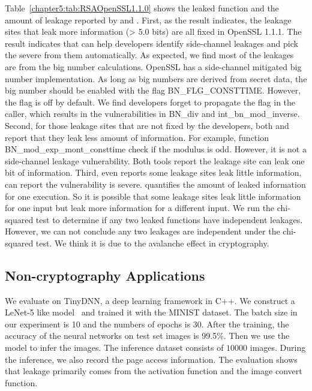 Table~\ref{chapter5:tab:RSAOpenSSL1.1.0} shows the leaked function and the amount of leakage reported by \tool{} and \ctool{}. First, as the result indicates, the leakage sites that leak more information (> 5.0 bits) are all fixed in OpenSSL 1.1.1. The result indicates that \ctool{} can help developers identify side-channel leakages and pick the severe from them automatically. As expected, we find most of the leakages are from the big number calculations. OpenSSL has a side-channel mitigated big number implementation. As long as big numbers are derived from secret data, the big number should be enabled with the flag \textsf{BN\_FLG\_CONSTTIME}. However, the flag is off by default. We find developers forget to propagate the flag in the caller, which results in the vulnerabilities in \textsf{BN\_div} and \textsf{int\_bn\_mod\_inverse}. Second, for those leakage sites that are not fixed by the developers, both \tool{} and \ctool{} report that they leak less amount of information. For example, function \textsf{BN\_mod\_exp\_mont\_consttime} check if the modulus is odd. However, it is not a side-channel leakage vulnerability. Both tools report the leakage site can leak one bit of information. Third, even \tool{} reports some leakage sites leak little information, \ctool{} can report the vulnerability is severe. \tool{} quantifies the amount of leaked information for one execution. So it is possible that some leakage sites leak little information for one input but leak more information for a different input. We run the chi-squared test to determine if any two leaked functions have independent leakages. However, we can not conclude any two leakages are independent under the chi-squared test. We think it is due to the avalanche effect in cryptography.

\subsection{Non-cryptography Applications}



We evaluate \ctool{} on TinyDNN, a deep learning framework in C++. We construct a LeNet-5 like model~\cite{lecun1998gradient} and trained it with the MINIST dataset. The batch size in our experiment is 10 and the numbers of epochs is 30. After the training, the accuracy of the neural networks on test set images is 99.5\%. Then we use the model to infer the images. The inference dataset consists of $10000$ images.  During the inference, we also record the page access information. The evaluation shows that  leakage primarily comes from the activation function and the image convert function.


